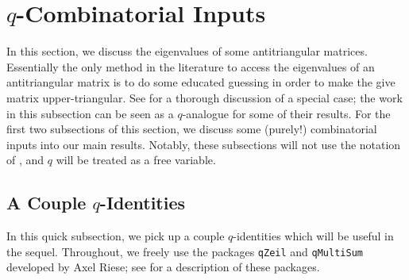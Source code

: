 
\section{\texorpdfstring{$q$}{q}-Combinatorial Inputs} \label{sec:qcombo}
In this section, we discuss the eigenvalues of some antitriangular matrices. Essentially the only method in the literature to access the eigenvalues of an antitriangular matrix is to do some educated guessing in order to make the give matrix upper-triangular. See \cite{britnell-antitriangular} for a thorough discussion of a special case; the work in this subsection can be seen as a $q$-analogue for some of their results. For the first two subsections of this section, we discuss some (purely!) combinatorial inputs into our main results. Notably, these subsections will not use the notation of , and $q$ will be treated as a free variable.

\subsection{A Couple \texorpdfstring{$q$}{q}-Identities}
In this quick subsection, we pick up a couple $q$-identities which will be useful in the sequel. Throughout, we freely use the packages \texttt{qZeil} and \texttt{qMultiSum} developed by Axel Riese; see \cite{riese-zeil,riese-multisum} for a description of these packages.

